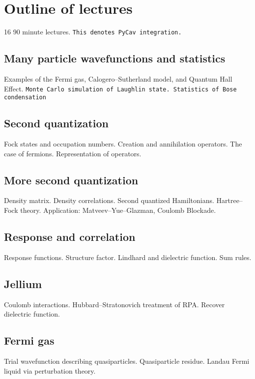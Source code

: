 \section{Outline of lectures}

16 90 minute lectures. \verb|This denotes PyCav integration.|

\subsection{Many particle wavefunctions and statistics}

Examples of the Fermi gas, Calogero--Sutherland model, and Quantum Hall Effect. \verb|Monte Carlo simulation of Laughlin state. Statistics of Bose condensation|

\subsection{Second quantization}

Fock states and occupation numbers. Creation and annihilation operators. The case of fermions. Representation of operators.

\subsection{More second quantization}

Density matrix. Density correlations. Second quantized Hamiltonians. Hartree--Fock theory. Application: Matveev--Yue--Glazman, Coulomb Blockade.

\subsection{Response and correlation}

Response functions. Structure factor. Lindhard and dielectric function. Sum rules.

\subsection{Jellium}

Coulomb interactions. Hubbard--Stratonovich treatment of RPA. Recover dielectric function.

\subsection{Fermi gas}

Trial wavefunction describing quasiparticles. Quasiparticle residue. Landau Fermi liquid via perturbation theory. 

